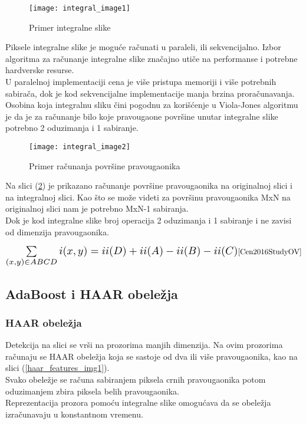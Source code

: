 \begin{figure}[h]
  \centering
  \texttt{[image: integral\_image1]}
  \caption{Primer integralne slike}
  \label{IntegralImage_img1}
\end{figure}

Piksele integralne slike je moguće računati u paraleli, ili
sekvencijalno. Izbor algoritma za računanje integralne slike značajno utiče na
performanse i potrebne hardverske resurse. \\
U paralelnoj implementaciji cena je
više pristupa memoriji i više potrebnih sabirača, dok je kod sekvencijalne
implementacije manja brzina proračunavanja. \\

Osobina koja integralnu sliku čini pogodnu za korišćenje u Viola-Jones algoritmu
je da je za računanje bilo koje pravougaone površine unutar integralne slike
potrebno 2 oduzimanja i 1 sabiranje.

\begin{figure}[h]
  \centering
  \texttt{[image: integral\_image2]}
  \caption{Primer računanja površine pravougaonika \cite{IntegralImage1_web}}
  \label{IntegralImage_img2}
\end{figure}

Na slici (\ref{IntegralImage_img2}) je prikazano računanje površine pravougaonika na
originalnoj slici i na integralnoj slici.
Kao što se može videti za površinu pravougaonika MxN na originalnoj slici nam je
potrebno MxN-1 sabiranja. \\
Dok je kod integralne slike broj operacija 2 oduzimanja i 1 sabiranje i ne zavisi od dimenzija pravougaonika.

\begin{equation}
  \Scale[1.4]{\sum\limits_{(x,y)\in ABCD} i(x,y)=ii(D)+ii(A)-ii(B)-ii(C)}
  \cite{Cen2016StudyOV}
  \label{IntegralImage_eq2}
\end{equation}

\newpage

\subsection{AdaBoost i HAAR obeležja}

\subsubsection{HAAR obeležja} \label{haar_features_sec}

Detekcija na slici se vrši na prozorima manjih dimenzija. Na ovim prozorima
računaju se HAAR obeležja koja se sastoje od dva ili više pravougaonika, kao na
slici (\ref{haar_features_img1}). \\
Svako obeležje se računa sabiranjem piksela crnih pravougaonika potom
oduzimanjem zbira piksela belih pravougaonika. \\
Reprezentacija prozora pomoću integralne slike omogućava da se obeležja izračunavaju u konstantnom vremenu.


